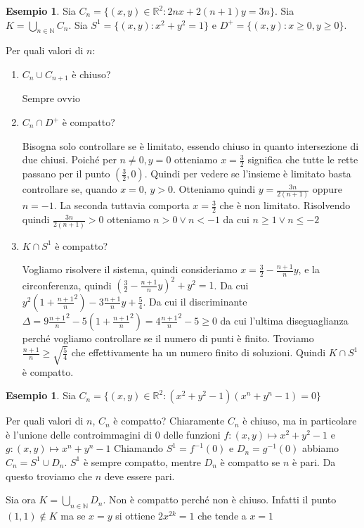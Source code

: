 \documentclass{article}
\newcounter{theo}[section]\setcounter{theo}{0}
\newcounter{excounter}[section]\setcounter{excounter}{0}
\theoremstyle{plain}
\theoremstyle{definition}
\newtheorem{example}[excounter]{Esempio}
\theoremstyle{remark}
\begin{document}
\begin{example}
    Sia \(C_n = \{(x, y) \in \mathbb{R}^2 : 2 n x + 2 (n+1) y = 3n\} \). Sia \(K
    = \bigcup_{n \in \mathbb{N}} C_n\). Sia \(S^{1} = \{(x, y) : x^2+y^2 = 1\}
    \) e \(D^{+} = \{(x, y) : x \ge 0, y \ge 0\} \).

    Per quali valori di \(n\):
\begin{enumerate}[label = \arabic*.]
    \item \(C_n \cup C_{n+1}\) è chiuso?

        Sempre ovvio
    \item \(C_n \cap D^{+}\) è compatto?

        Bisogna solo controllare se è limitato, essendo chiuso in quanto
        intersezione di due chiusi.
        Poiché per \(n\neq 0, y = 0\) otteniamo \(x = \frac{3}{2}\) significa
        che tutte le rette passano per il punto \((\frac{3}{2}, 0)\). Quindi per
        vedere se l'insieme è limitato basta controllare se, quando \(x=0\), \(y
        > 0\). Otteniamo quindi \(y = \frac{3n}{2(n+1)}\) oppure \(n = -1\). La
        seconda tuttavia comporta \(x = \frac{3}{2}\) che è non limitato.
        Risolvendo quindi \(\frac{3n}{2(n+1)} > 0\) otteniamo \(n > 0 \lor n <
        -1\) da cui \(n \ge 1 \lor n \le -2 \) 
    \item \(K \cap S^{1}\) è compatto?

        Vogliamo risolvere il sistema, quindi consideriamo \(x = \frac{3}{2} -
        \frac{n+1}{n} y\), e la circonferenza, quindi \(\left(\frac{3}{2} -
        \frac{n+1}{n} y \right)^2 + y^2 = 1\). Da cui \(y^2 \left( 1 +
    \frac{n+1}{n}^2 \right) - 3 \frac{n+1}{n} y + \frac{5}{4}\).
        Da cui il discriminante \(\Delta = 9 \frac{n+1}{n}^2 - 5 \left( 1 +
        \frac{n+1}{n}^2 \right) = 4 \frac{n+1}{n}^2 - 5 \ge 0\) da cui l'ultima
        diseguaglianza perché vogliamo controllare se il numero di punti è
        finito. Troviamo \(\frac{n+1}{n} \ge \sqrt{\frac{5}{4}}\) che
        effettivamente ha un numero finito di soluzioni. Quindi \(K \cap S^{1}\)
        è compatto.
\end{enumerate}
\end{example}

\begin{example}
    Sia \(C_n = \{(x, y) \in \mathbb{R}^2 : (x^2+y^2-1)(x^{n} + y^{n} - 1) = 0\} \) 

    Per quali valori di \(n\), \(C_n\) è compatto? Chiaramente \(C_n\) è chiuso,
    ma in particolare è l'unione delle controimmagini di \(0\) delle funzioni
    \(f: (x, y) \mapsto x^2 + y^2 - 1\) e \(g: (x, y) \mapsto x^{n} + y^{n} -
    1\) Chiamando \(S^{1} = f^{-1}(0) \) e \(D_n = g^{-1}(0)\) abbiamo \(C_n =
    S^{1} \cup D_n\). \(S^{1}\) è sempre compatto, mentre \(D_n\) è compatto se
    \(n\) è pari. Da questo troviamo che \(n\) deve essere pari.

    Sia ora \(K= \bigcup_{n \in \mathbb{N}} D_n\). Non è compatto perché non è
    chiuso. Infatti il punto \((1,1) \not\in K\) ma se \(x = y\) si ottiene \(2
    x^{2k} = 1\) che tende a \(x = 1\) 
\end{example}
\end{document}
